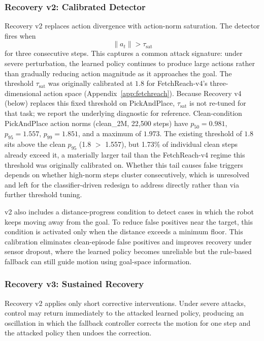 \documentclass[conference]{IEEEtran}
\begin{document}
\subsubsection{Recovery v2: Calibrated Detector}

Recovery v2 replaces action divergence with action-norm saturation. The detector fires
when
\[
\lVert a_t\rVert > \tau_{\mathrm{sat}}
\]
for three consecutive steps. This captures a common attack signature: under severe
perturbation, the learned policy continues to produce large actions rather than
gradually reducing action magnitude as it approaches the goal. The threshold
$\tau_{\mathrm{sat}}$ was originally calibrated at $1.8$ for FetchReach-v4's
three-dimensional action space (Appendix~\ref{app:fetchreach}). Because Recovery v4
(below) replaces this fixed threshold on PickAndPlace, $\tau_{\mathrm{sat}}$ is not
re-tuned for that task; we report the underlying diagnostic for reference. Clean-condition PickAndPlace action
norms (clean\_2M, 22{,}500 steps) have $p_{50}=0.981$, $p_{95}=1.557$, $p_{99}=1.851$,
and a maximum of $1.973$. The existing threshold of $1.8$ sits above the clean $p_{95}$
(1.8 $>$ 1.557), but 1.73\% of individual clean steps already exceed it, a materially
larger tail than the FetchReach-v4 regime this threshold was originally calibrated on.
Whether this tail causes false triggers depends on whether high-norm steps cluster
consecutively, which is unresolved and left for the classifier-driven redesign to
address directly rather than via further threshold tuning.

v2 also includes a distance-progress condition to detect cases in which the robot keeps
moving away from the goal. To reduce false positives near the target, this condition is
activated only when the distance exceeds a minimum floor. This calibration eliminates
clean-episode false positives and improves recovery under sensor dropout, where the
learned policy becomes unreliable but the rule-based fallback can still guide motion
using goal-space information.

\subsubsection{Recovery v3: Sustained Recovery}

Recovery v2 applies only short corrective interventions. Under severe attacks, control
may return immediately to the attacked learned policy, producing an oscillation in which
the fallback controller corrects the motion for one step and the attacked policy then
undoes the correction.
\end{document}

